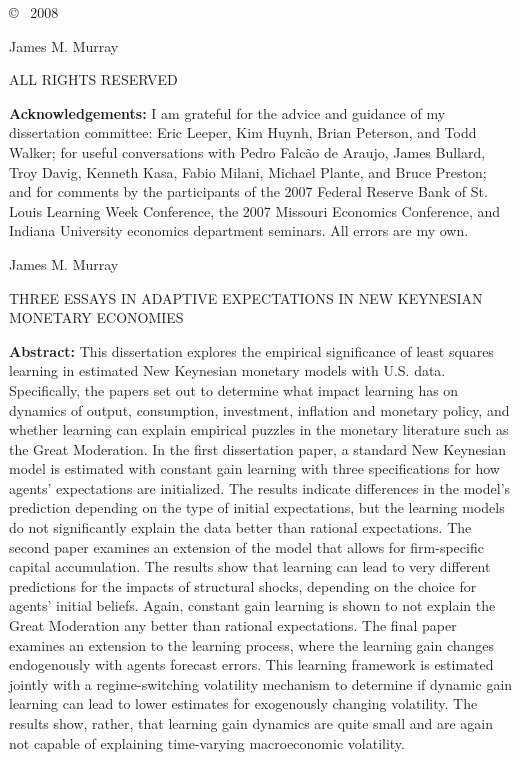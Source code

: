 \documentclass[12pt,notitlepage,oneside]{book}
\begin{document}
\begin{center}
\vspace*{3in}

\copyright~ 2008

James M. Murray

ALL RIGHTS RESERVED

\end{center}
\newpage

\vspace*{1in}

\noindent \textbf{Acknowledgements:} I am grateful for the advice and guidance of my dissertation committee: Eric Leeper, Kim Huynh, Brian Peterson, and Todd Walker; for useful conversations with Pedro Falc\~{a}o de Araujo, James Bullard, Troy Davig, Kenneth Kasa, Fabio Milani, Michael Plante, and Bruce Preston; and for comments by the participants of the 2007 Federal Reserve Bank of St. Louis Learning Week Conference, the 2007 Missouri Economics Conference, and Indiana University economics department seminars.  All errors are my own.
\newpage

\begin{center}
James M. Murray

\vspace*{0.5pc}

THREE ESSAYS IN ADAPTIVE EXPECTATIONS IN NEW KEYNESIAN MONETARY ECONOMIES
\end{center}

\vspace*{0.5pc}

\noindent \textbf{Abstract:} This dissertation explores the empirical significance of least squares learning in estimated New Keynesian monetary models with U.S. data.  Specifically, the papers set out to determine what impact learning has on dynamics of output, consumption, investment, inflation and monetary policy, and whether learning can explain empirical puzzles in the monetary literature such as the Great Moderation.  In the first dissertation paper, a standard New Keynesian model is estimated with constant gain learning with three specifications for how agents' expectations are initialized.  The results indicate differences in the model's prediction depending on the type of initial expectations, but the learning models do not significantly explain the data better than rational expectations.  The second paper examines an extension of the model that allows for firm-specific capital accumulation. The results show that learning can lead to very different predictions for the impacts of structural shocks, depending on the choice for agents' initial beliefs.  Again, constant gain learning is shown to not explain the Great Moderation any better than rational expectations.  The final paper examines an extension to the learning process, where the learning gain changes endogenously with agents forecast errors.  This learning framework is estimated jointly with a regime-switching volatility mechanism to determine if dynamic gain learning can lead to lower estimates for exogenously changing volatility.  The results show, rather, that learning gain dynamics are quite small and are again not capable of explaining time-varying macroeconomic volatility.
\end{document}
